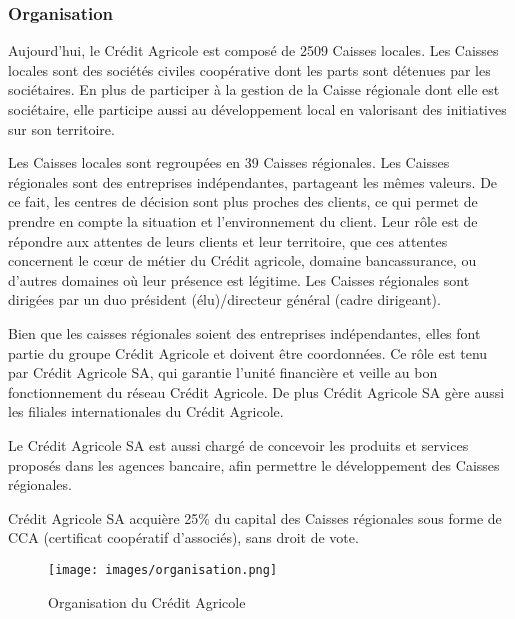 \documentclass[12pt,a4paper]{article}
\begin{document}
\subsubsection{Organisation}
Aujourd'hui, le Crédit Agricole est composé de 2509 Caisses locales. Les Caisses locales sont des sociétés civiles coopérative dont les parts sont détenues par les sociétaires. En plus de participer à la gestion de la Caisse régionale dont elle est sociétaire, elle participe aussi au développement local en valorisant des initiatives sur son territoire.\par 
\medskip
Les Caisses locales sont regroupées en 39 Caisses régionales. Les Caisses régionales sont des entreprises indépendantes, partageant les mêmes valeurs. De ce fait, les centres de décision sont plus proches des clients, ce qui permet de prendre en compte la situation et l'environnement du client. Leur rôle est de répondre aux attentes de leurs clients et leur territoire, que ces attentes concernent le cœur de métier du Crédit agricole, domaine bancassurance, ou d'autres domaines où leur présence est légitime. Les Caisses régionales sont dirigées par un duo président (élu)/directeur général (cadre dirigeant). \par 
\medskip
Bien que les caisses régionales soient des entreprises indépendantes, elles font partie du groupe Crédit Agricole et doivent être coordonnées. Ce rôle est tenu par Crédit Agricole SA, qui garantie l'unité financière et veille au bon fonctionnement du réseau Crédit Agricole. De plus Crédit Agricole SA gère aussi les filiales internationales du Crédit Agricole.\par 
Le Crédit Agricole SA est aussi chargé de concevoir les produits et services proposés dans les agences bancaire, afin permettre le développement des Caisses régionales.\par
Crédit Agricole SA acquière 25\% du capital des Caisses régionales sous forme de CCA (certificat coopératif d'associés), sans droit de vote.

\begin{figure}[h!]
\centering
\texttt{[image: images/organisation.png]}
\caption{Organisation du Crédit Agricole}
\end{figure}

\newpage
\end{document}
